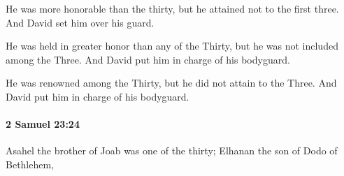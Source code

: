 			\begin{versebox}
					\item[BHS] 
					\item[ASV] He was more honorable than the thirty, but he attained not to the first three. And David set him over his guard.
					\item[NIV] He was held in greater honor than any of the Thirty, but he was not included among the Three. And David put him in charge of his bodyguard.
					\item[NRSV] He was renowned among the Thirty, but he did not attain to the Three. And David put him in charge of his bodyguard.
			\end{versebox}

		\paragraph{2 Samuel 23:24} %
			\label{2SAMUEL-23-24}

			Asahel the brother of Joab was one of the thirty; Elhanan the son of Dodo of Bethlehem,

